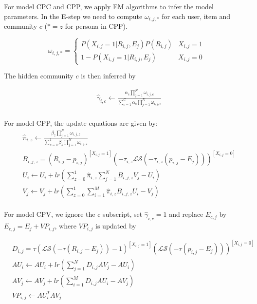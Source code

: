 \documentclass[sigconf]{acmart}
\begin{document}
For model CPC and CPP, we apply EM algorithms to infer the model parameters. In the E-step we need to compute $\omega_{i,j,*}$ for each user, item and community $c$ ($*=z$ for persona in CPP). 

\begin{equation}
\omega_{i,j,*}=
\begin{cases}
P(X_{i,j}=1|R_{i,j},E_{j})P(R_{i,j})& \text{$X_{i,j}=1$}\\\nonumber
1-P(X_{i,j}=1|R_{i,j},E_{j})& \text{$X_{i,j}=0$}
\end{cases}
\end{equation}

The hidden community $c$ is then inferred by

\begin{equation}\label{equ:updateCPC}
\begin{split}
&\hat{\gamma}_{i,c}\leftarrow\frac{\alpha_c\prod_{j=1}^{N}\omega_{i,j,c}}{\sum_{c=1}^{C}\alpha_c\prod_{j=1}^{N}\omega_{i,j,c}} \\
\end{split}
\end{equation}

For model CPP, the update equations are given by:
\begin{equation}
\begin{split}
&\hat{\pi}_{i,z}\leftarrow\frac{\beta_z\prod_{j=1}^{N}\omega_{i,j,z}}{\sum_{z=0}^{1}\beta_z\prod_{j=1}^{N}\omega_{i,j,z}} \\
&B_{i,j,z}=(R_{i,j}-p_{i,j})^{[X_{i,j}=1]}(-\tau_{i,z}\mathcal{LS}(-\tau_{i,z}(p_{i,j}-E_{j})))^{[X_{i,j}=0]} \\
&U_{i}\leftarrow U_{i}+lr(\sum\limits_{z=0}^{1}\hat{\pi}_{i,z}\sum\limits_{j=1}^{N}B_{i,j,z}V_j-U_{i}) \\
&V_j\leftarrow V_j+lr(\sum\limits_{z=0}^{1}\sum\limits_{i=1}^{M}\hat{\pi}_{i,z}B_{i,j,z}U_{i}-V_j) \\
\end{split}
\end{equation}

For  model CPV,  we ignore the c subscript, set $\hat{\gamma}_{i,c}=1$ and replace $E_{c,j}$ by $E_{c,j}=E_{j}+VP_{i,j}$, where $VP_{i,j}$ is updated by

\begin{equation}
\begin{split}
&D_{i,j}=\tau(\mathcal{LS}(-\tau(R_{i,j}-E_{j}))-1)^{[X_{i,j}=1]}(\mathcal{LS}(-\tau(p_{i,j}-E_{j})))^{[X_{i,j}=0]} \\
&AU_{i}\leftarrow AU_{i}+lr(\sum\limits_{j=1}^{N}D_{i,j}AV_j-AU_{i}) \\
&AV_{j}\leftarrow AV_{j}+lr(\sum\limits_{i=1}^{M}D_{i,j}AU_{i}-AV_j) \\
&VP_{i,j} \leftarrow AU_{i}^{T}AV_{j} \\
\end{split}
\end{equation}
\end{document}
